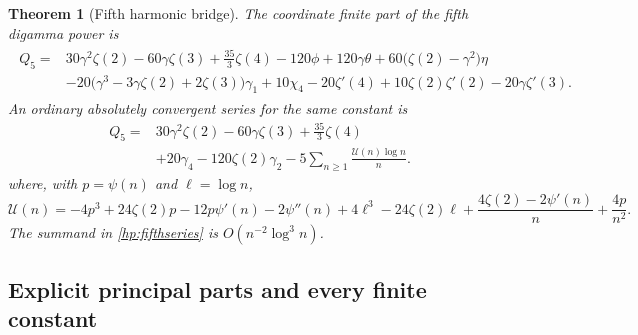 \documentclass[11pt]{article}
\numberwithin{equation}{section}
\theoremstyle{plain}
\newtheorem{theorem}{Theorem}[section]
\theoremstyle{definition}
\theoremstyle{remark}
\begin{document}
\begin{theorem}[Fifth harmonic bridge]\label{hp:fifth}
The coordinate finite part of the fifth digamma power is
\begin{align}\label{hp:fifthmain}
 \boxed{\begin{aligned}
 Q_5={}&30\gamma^2\zeta(2)-60\gamma\zeta(3)+\frac{35}{3}\zeta(4)
       -120\phi+120\gamma\theta
       +60\bigl(\zeta(2)-\gamma^2\bigr)\eta\\
 &-20\bigl(\gamma^3-3\gamma\zeta(2)+2\zeta(3)\bigr)\gamma_1
       +10\chi_4-20\zeta'(4)
       +10\zeta(2)\zeta'(2)-20\gamma\zeta'(3).
 \end{aligned}}
\end{align}
An ordinary absolutely convergent series for the same constant is
\begin{equation}\label{hp:fifthseries}
 \boxed{\begin{aligned}
 Q_5={}&30\gamma^2\zeta(2)-60\gamma\zeta(3)+\frac{35}{3}\zeta(4)\\
      &+20\gamma_4-120\zeta(2)\gamma_2
       -5\sum_{n\ge1}\frac{\mathcal U(n)\log n}{n}.
 \end{aligned}}
\end{equation}
where, with $p=\psi(n)$ and $\ell=\log n$,
\begin{equation}\label{hp:Un}
 \mathcal U(n)=-4p^3+24\zeta(2)p-12p\psi'(n)-2\psi''(n)
    +4\ell^3-24\zeta(2)\ell
    +\frac{4\zeta(2)-2\psi'(n)}n+\frac{4p}{n^2}.
\end{equation}
The summand in \eqref{hp:fifthseries} is
$O(n^{-2}\log^3n)$.
\end{theorem}

\subsection{Explicit principal parts and every finite constant}
\end{document}
